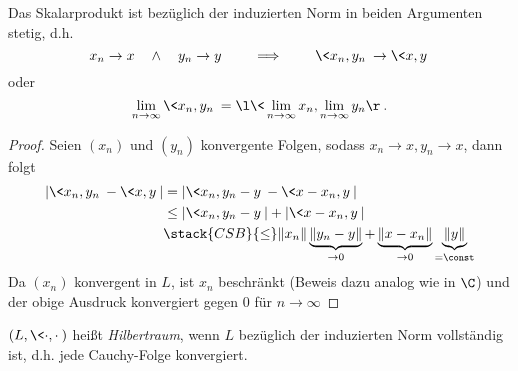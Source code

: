 \documentclass{mycourse}
\begin{document}
\begin{kor}
	Das Skalarprodukt ist bezüglich der induzierten Norm in beiden Argumenten stetig, d.h.
	\[
		x_n \to x \quad\land\quad y_n \to y
		\qquad \implies \qquad
		\<x_n, y_n\> \to \<x,y\>
	\]
	oder
	\[
		\lim_{n\to \infty} \<x_n, y_n\> = \l\<\lim_{n\to \infty} x_n, \lim_{n\to\infty} y_n \r\>.
	\]
	\begin{proof}
	Seien $ (x_n) $ und $ (y_n) $ konvergente Folgen, sodass $ x_n \to x, y_n \to x $, dann folgt
		\begin{align*}
			|\<x_n,y_n\> - \<x,y\>|
			&= |\<x_n, y_n - y\> - \<x-x_n,y\>| \\
			&\le |\<x_n,y_n -y\>| + |\<x-x_n,y\>| \\
			&\stack{CSB}{\le} \|x_n\| \underbrace{\|y_n -y\|}_{\to 0} + \underbrace{\|x-x_n\|}_{\to 0} \underbrace{\|y\|}_{=\const}
			\end{align*}
		Da $(x_n)$ konvergent in $L$, ist $x_n$ beschränkt (Beweis dazu analog wie in $\C$) und der obige Ausdruck konvergiert gegen $ 0 $ für $ n\to \infty $
			
		
	\end{proof}
\end{kor}

\begin{df}[Hilbertraum] \label{1.5}
	$(L, \<\cdot, \cdot\>)$ heißt \emph{Hilbertraum}, wenn $L$ bezüglich der induzierten Norm vollständig ist, d.h. jede Cauchy-Folge konvergiert.
\end{df}
\end{document}

